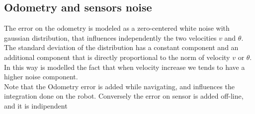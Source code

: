 \subsection{Odometry and sensors noise}
The error on the odometry is modeled as a zero-centered white noise with gaussian distribution, that influences independently the two velocities $v$ and $\theta$.
The standard deviation of the distribution has a constant component and an additional component that is directly proportional to the norm of velocity $v$ or $\theta$.
In this way is modelled the fact that when velocity increase we tends to have a higher noise component.
\\


Note that the Odometry error is added while navigating, and influences the integration done on the robot. Conversely the error on sensor is added off-line, and it is indipendent 



